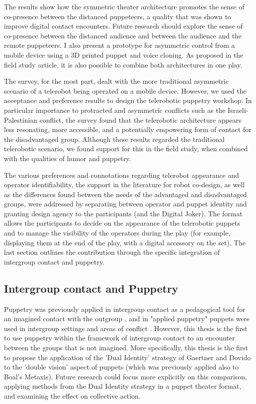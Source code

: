\documentclass[dissertation,math,vertlayout,pdfa,colorlinks]{aaltoseries}
\begin{document}
The results show how the symmetric theater architecture promotes the sense of co-presence between the distanced puppeteers, a quality that was shown to improve digital contact encounters. Future research should explore the sense of co-presence between the distanced audience and between the audience and the remote puppeteers. I also present a prototype for asymmetric control from a mobile device using a 3D printed puppet and voice cloning. As proposed in the field study article, it is also possible to combine both architectures in one play.

The survey, for the most part, dealt with the more traditional asymmetric scenario of a telerobot being operated on a mobile device. However, we used the acceptance and preference results to design the telerobotic puppetry workshop. In particular importance to protracted and asymmetric conflicts such as the Israeli-Palestinian conflict, the survey found that the telerobotic architecture appears less resonating, more accessible, and a potentially empowering form of contact for the disadvantaged group. Although these results regarded the traditional telerobotic scenario, we found support for this in the field study, when combined with the qualities of humor and puppetry. 

The various preferences and connotations regarding telerobot appearance and operator identifiability, the support in the literature for robot co-design, as well as the differences found between the needs of the advantaged and disadvantaged groups, were addressed by separating between operator and puppet identity and granting design agency to the participants (and the Digital Joker). The format allows the participants to decide on the appearance of the telerobotic puppets and to manage the visibility of the operators during the play (for example, displaying them at the end of the play, with a digital accessory on the set). The last section outlines the contribution through the specific integration of intergroup contact and puppetry.

\subsection{Intergroup contact and Puppetry}
Puppetry was previously applied in intergroup contact as a pedagogical tool for an imagined contact with the outgroup \cite{charalampidouInventingNewRoad2022}, and in "applied puppetry" puppets were used in intergroup settings and areas of conflict \cite{grantObjectsObjectivesApplied2020}. However, this thesis is the first to use puppetry within the framework of intergroup contact to an encounter between the groups that is not imagined. More specifically, this thesis is the first to propose the application of the 'Dual Identity' strategy of Gaertner and Dovido to the 'double vision' aspect of puppets (which was previously applied also to Boal's Metaxis). Future research could focus more explicitly on this comparison, applying methods from the Dual Identity strategy in a puppet theater format, and examining the effect on collective action.
\end{document}

